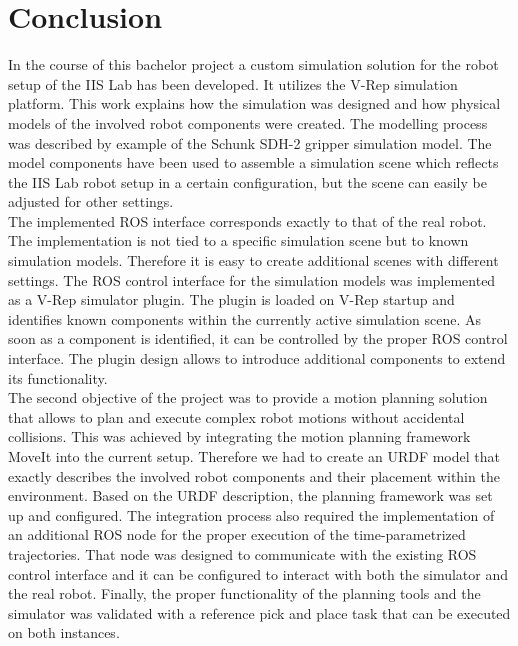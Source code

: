 
\chapter{Conclusion}

In the course of this bachelor project a custom simulation solution for the robot setup of the IIS Lab has been developed. It utilizes the V-Rep simulation platform. This work explains how the simulation was designed and how physical models of the involved robot components were created. The modelling process was described by example of the Schunk SDH-2 gripper simulation model. The model components have been used to assemble a simulation scene which reflects the IIS Lab robot setup in a certain configuration, but the scene can easily be adjusted for other settings. \\

The implemented ROS interface corresponds exactly to that of the real robot. The implementation is not tied to a specific simulation scene but to known simulation models. Therefore it is easy to create additional scenes with different settings. The ROS control interface for the simulation models was implemented as a V-Rep simulator plugin. The plugin is loaded on V-Rep startup and identifies known components within the currently active simulation scene. As soon as a component is identified, it can be controlled by the proper ROS control interface. The plugin design allows to introduce additional components to extend its functionality. \\

The second objective of the project was to provide a motion planning solution that allows to plan and execute complex robot motions without accidental collisions. This was achieved by integrating the motion planning framework MoveIt into the current setup. Therefore we had to create an URDF model that exactly describes the involved robot components and their placement within the environment. Based on the URDF description, the planning framework was set up and configured. The integration process also required the implementation of an additional ROS node for the proper execution of the time-parametrized trajectories. That node was designed to communicate with the existing ROS control interface and it can be configured to interact with both the simulator and the real robot. Finally, the proper functionality of the planning tools and the simulator was validated with a reference pick and place task that can be executed on both instances.
